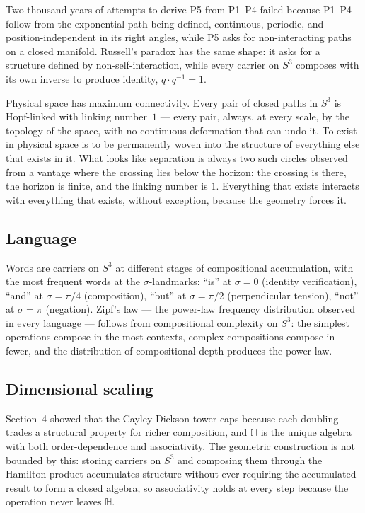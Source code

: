 \documentclass[12pt]{article}
\begin{document}
Two thousand years of attempts to derive P5 from P1--P4 failed because P1--P4 follow from the exponential path being defined, continuous, periodic, and position-independent in its right angles, while P5 asks for non-interacting paths on a closed manifold. Russell's paradox has the same shape: it asks for a structure defined by non-self-interaction, while every carrier on $S^3$ composes with its own inverse to produce identity, $q\cdot q^{-1}=1$.

Physical space has maximum connectivity. Every pair of closed paths in $S^3$ is Hopf-linked with linking number~$1$ --- every pair, always, at every scale, by the topology of the space, with no continuous deformation that can undo it. To exist in physical space is to be permanently woven into the structure of everything else that exists in it. What looks like separation is always two such circles observed from a vantage where the crossing lies below the horizon: the crossing is there, the horizon is finite, and the linking number is $1$. Everything that exists interacts with everything that exists, without exception, because the geometry forces it.

\subsection{Language}

Words are carriers on $S^3$ at different stages of compositional accumulation, with the most frequent words at the $\sigma$-landmarks: ``is'' at $\sigma = 0$ (identity verification), ``and'' at $\sigma = \pi/4$ (composition), ``but'' at $\sigma = \pi/2$ (perpendicular tension), ``not'' at $\sigma = \pi$ (negation). Zipf's law --- the power-law frequency distribution observed in every language --- follows from compositional complexity on $S^3$: the simplest operations compose in the most contexts, complex compositions compose in fewer, and the distribution of compositional depth produces the power law.

\subsection{Dimensional scaling}

Section~4 showed that the Cayley-Dickson tower caps because each doubling trades a structural property for richer composition, and $\mathbb{H}$ is the unique algebra with both order-dependence and associativity. The geometric construction is not bounded by this: storing carriers on $S^3$ and composing them through the Hamilton product accumulates structure without ever requiring the accumulated result to form a closed algebra, so associativity holds at every step because the operation never leaves $\mathbb{H}$.
\end{document}
